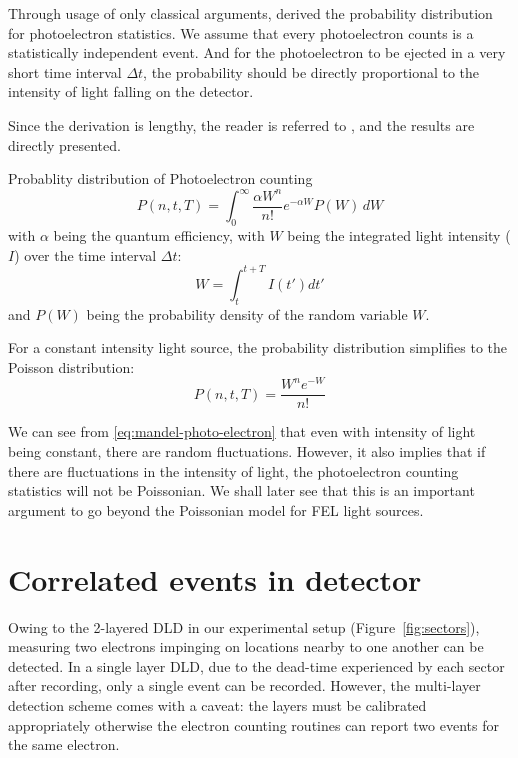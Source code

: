 Through usage of only classical arguments, \citeauthor{mandelFluctuationsPhotonBeams1958} \cite{mandelFluctuationsPhotonBeams1958,mandelFluctuationsPhotonBeams1959} derived the probability distribution for photoelectron statistics. We assume that every photoelectron counts is a statistically independent event. And for the photoelectron to be ejected in a very short time interval $\Delta t$, the probability should be directly proportional to the intensity of light falling on the detector.

Since the derivation is lengthy, the reader is referred to \cite{mehtaVIIITheoryPhotoelectron1970}, and the results are directly presented.
\begin{note}
    {Probablity distribution of Photoelectron counting}
    \begin{equation}\label{eq:mandel-photo-electron}
        P(n, t, T) = \int_{0}^{\infty} \frac{\alpha W^n}{n!} e^{-\alpha W} P(W) \, dW
    \end{equation}
    with $\alpha$ being the quantum efficiency, with $W$ being the integrated light intensity ($I$) over the time interval $\Delta t$:
    \begin{equation}
        W = \int_{t}^{t+T} I(t') dt'
    \end{equation}
    and $P(W)$ being the probability density of the random variable $W$.

    For a constant intensity light source, the probability distribution simplifies to the Poisson distribution:
    \begin{equation}
        P(n, t, T) = \frac{W^n e^{-W}}{n!} 
    \end{equation}
\end{note}

We can see from \ref{eq:mandel-photo-electron} that even with intensity of light being constant, there are random fluctuations. However, it also implies that if there are fluctuations in the intensity of light, the photoelectron counting statistics will not be Poissonian. We shall later see that this is an important argument to go beyond the Poissonian model for \gls{FEL} light sources.

\section{Correlated events in detector}
Owing to the 2-layered \gls{DLD} in our experimental setup (Figure~\ref{fig:sectors}), measuring two electrons impinging on locations nearby to one another can be detected. In a single layer \gls{DLD}, due to the dead-time experienced by each sector after recording, only a single event can be recorded. However, the multi-layer detection scheme comes with a caveat: the layers must be calibrated appropriately otherwise the electron counting routines can report two events for the same electron. 

